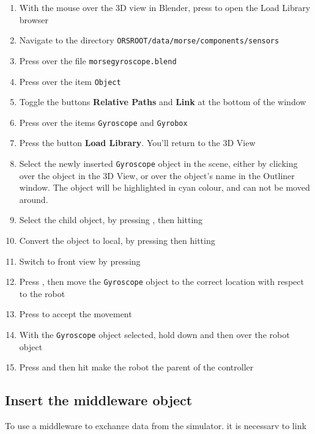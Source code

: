 \documentclass[twoside,a4paper,10pt]{report}
\newcommand{\dokutitleleveltree}[1]{\subsection{#1}}
\newcommand{\dokubold}[1]{\textbf{#1}}
\newcommand{\dokumonospace}[1]{\texttt{#1}}
\newcommand{\dokuitem}{\item}
\begin{document}
\begin{enumerate}\dokuitem  With the mouse over the 3D view in Blender, press  to open the Load Library browser
\dokuitem  Navigate to the directory \dokumonospace{{\textdollar}ORS{\textunderscore}ROOT/data/morse/components/sensors}
\dokuitem  Press  over the file \dokumonospace{morse{\textunderscore}gyroscope.blend}
\dokuitem  Press  over the item \dokumonospace{Object}
\dokuitem  Toggle the buttons \dokubold{Relative Paths} and \dokubold{Link} at the bottom of the window
\dokuitem  Press  over the items \dokumonospace{Gyroscope} and \dokumonospace{Gyro{\textunderscore}box}
\dokuitem  Press the button \dokubold{Load Library}. You'll return to the 3D View
\dokuitem  Select the newly inserted \dokumonospace{Gyroscope} object in the scene, either by  clicking over the object in the 3D View, or  over the object's name in the Outliner window. The object will be highlighted in cyan colour, and can not be moved around.
\dokuitem  Select the child object, by pressing , then hitting 
\dokuitem  Convert the object to local, by pressing  then hitting 
\dokuitem  Switch to front view by pressing 
\dokuitem  Press , then move the \dokumonospace{Gyroscope} object to the correct location with respect to the robot
\dokuitem  Press  to accept the movement
\dokuitem  With the \dokumonospace{Gyroscope} object selected, hold down  and then  over the robot object
\dokuitem  Press  and then hit  make the robot the parent of the controller
\end{enumerate}

\dokutitleleveltree{Insert the middleware object}
\label{fc2213e90f6f9853c66c14f9f79c3379}%
To use a middleware to exchange data from the simulator, it is necessary to link in an object that will represent the middleware.



\begin{enumerate}\dokuitem  With the mouse over the 3D view in Blender, press  to open the Load Library browser
\dokuitem  Navigate to the directory \dokumonospace{{\textdollar}ORS{\textunderscore}ROOT/data/morse/components/middleware}
\dokuitem  Press  over the file \dokumonospace{socket{\textunderscore}empty.blend}
\dokuitem  Press  over the item \dokumonospace{Object}
\dokuitem  Toggle the buttons \dokubold{Relative Paths} and \dokubold{Link} at the bottom of the window
\dokuitem  Press  over the item \dokumonospace{Socket{\textunderscore}Empty}
\dokuitem  Press the button \dokubold{Load Library}. You'll return to the 3D View
\dokuitem  It is not necessary to make this object local or to move it. But it can be useful to avoid cluttering of items in the scene
\end{enumerate}
\end{document}
